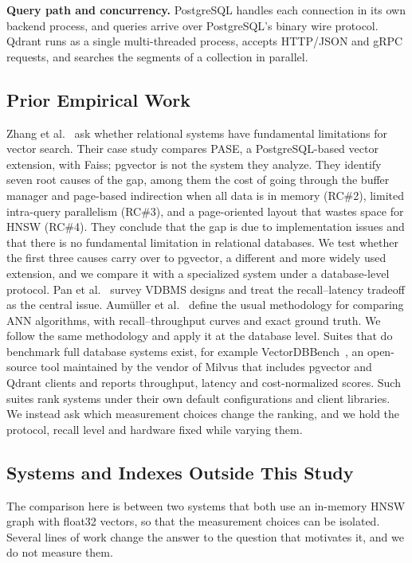 \documentclass[sigconf, nonacm]{acmart}
\begin{document}
\textbf{Query path and concurrency.} PostgreSQL handles each connection in its own
backend process, and queries arrive over PostgreSQL's binary wire protocol. Qdrant runs
as a single multi-threaded process, accepts HTTP/JSON and gRPC requests, and searches the
segments of a collection in parallel.

\subsection{Prior Empirical Work}

Zhang et al.~\cite{zhang2024} ask whether relational systems have fundamental
limitations for vector search. Their case study compares PASE, a PostgreSQL-based
vector extension, with Faiss; pgvector is not the system they analyze. They identify
seven root causes of the gap, among them the cost of going through the buffer manager
and page-based indirection when all data is in memory (RC\#2), limited intra-query
parallelism (RC\#3), and a page-oriented layout that wastes space for HNSW
(RC\#4). They conclude that the gap is due to implementation issues and that there is no
fundamental limitation in relational databases. We test whether the first three causes
carry over to pgvector, a different and more widely used extension, and we compare it
with a specialized system under a database-level protocol. Pan et al.~\cite{pan2024survey} survey VDBMS
designs and treat the recall--latency tradeoff as the central issue. Aumüller et
al.~\cite{aumuller2020} define the usual methodology for comparing ANN algorithms, with
recall--throughput curves and exact ground truth. We follow the same methodology and
apply it at the database level. Suites that do benchmark full database systems exist,
for example VectorDBBench~\cite{vectordbbench}, an open-source tool maintained by the
vendor of Milvus that includes pgvector and Qdrant clients and reports throughput,
latency and cost-normalized scores. Such suites rank systems under their own default
configurations and client libraries. We instead ask which measurement choices change the
ranking, and we hold the protocol, recall level and hardware fixed while varying them.

\subsection{Systems and Indexes Outside This Study}

The comparison here is between two systems that both use an in-memory HNSW graph with
float32 vectors, so that the measurement choices can be isolated. Several lines of work
change the answer to the question that motivates it, and we do not measure them.
\end{document}
